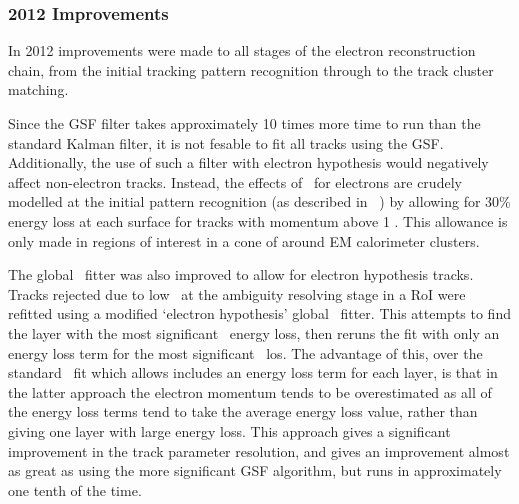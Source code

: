 \subsubsection{2012 Improvements}

In 2012 improvements were made to all stages of the electron reconstruction
chain, from the initial tracking pattern recognition through to the track
cluster matching. 

Since the GSF filter takes approximately 10 times more time to
run than the standard Kalman filter, it is not fesable to fit all tracks using
the GSF. Additionally, the use of such a filter with electron hypothesis would
negatively affect non-electron tracks. Instead, the effects of \brem\ for
electrons are crudely modelled at the initial pattern recognition (as described
in ~) by allowing for 30\% energy loss at each surface for tracks with
momentum above 1 \gev. This allowance is only made in regions of interest in a
cone of  around EM calorimeter clusters. 

The global \chisqaured\
fitter was also improved to allow for electron hypothesis tracks. Tracks
rejected due to low \chisquared\ at the ambiguity resolving stage in a RoI were
refitted using a modified `electron hypothesis' global \chisqaured\ fitter. This
attempts to find the layer with the most significant \brem\ energy loss, then
reruns the fit with only an energy loss term for the most significant \brem\
los. The advantage of this, over the standard \chisquared\ fit which allows
includes an energy loss term for each layer, is that in the latter approach the
electron momentum tends to be overestimated as all of the energy loss terms tend
to take the average energy loss value, rather than giving one layer with large
energy loss. This approach gives a significant improvement in the track
parameter resolution, and gives an improvement almost as great as using the more
significant GSF algorithm, but runs in approximately one tenth of the time.

